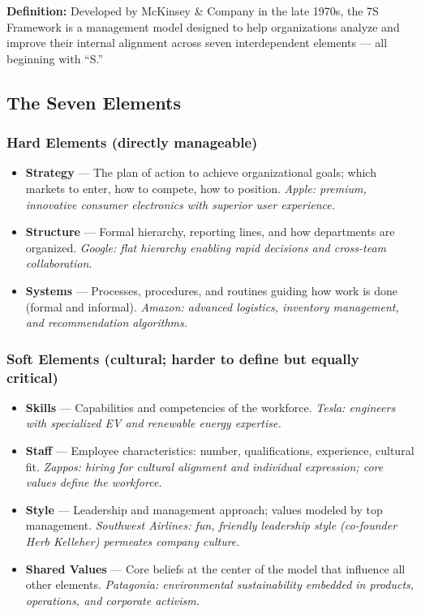 \documentclass[11pt, letterpaper]{article}
\begin{document}
\begin{defbox}
\textbf{Definition:} Developed by McKinsey \& Company in the late 1970s, the 7S Framework is a management model designed to help organizations analyze and improve their internal alignment across seven interdependent elements --- all beginning with ``S.''
\end{defbox}

\subsection{The Seven Elements}

\subsubsection{Hard Elements (directly manageable)}

\begin{itemize}[leftmargin=*]
  \item \textbf{Strategy} --- The plan of action to achieve organizational goals; which markets to enter, how to compete, how to position. \textit{Apple: premium, innovative consumer electronics with superior user experience.}
  \item \textbf{Structure} --- Formal hierarchy, reporting lines, and how departments are organized. \textit{Google: flat hierarchy enabling rapid decisions and cross-team collaboration.}
  \item \textbf{Systems} --- Processes, procedures, and routines guiding how work is done (formal and informal). \textit{Amazon: advanced logistics, inventory management, and recommendation algorithms.}
\end{itemize}

\subsubsection{Soft Elements (cultural; harder to define but equally critical)}

\begin{itemize}[leftmargin=*]
  \item \textbf{Skills} --- Capabilities and competencies of the workforce. \textit{Tesla: engineers with specialized EV and renewable energy expertise.}
  \item \textbf{Staff} --- Employee characteristics: number, qualifications, experience, cultural fit. \textit{Zappos: hiring for cultural alignment and individual expression; core values define the workforce.}
  \item \textbf{Style} --- Leadership and management approach; values modeled by top management. \textit{Southwest Airlines: fun, friendly leadership style (co-founder Herb Kelleher) permeates company culture.}
  \item \textbf{Shared Values} --- Core beliefs at the center of the model that influence all other elements. \textit{Patagonia: environmental sustainability embedded in products, operations, and corporate activism.}
\end{itemize}
\end{document}

